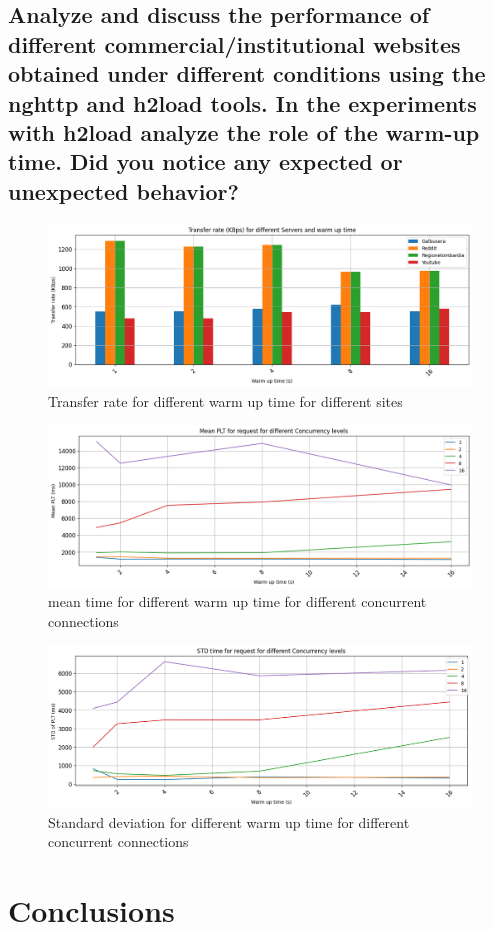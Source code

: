 \documentclass[eng]{class}
\begin{document}
\subsection*{Analyze and discuss the performance of different commercial/institutional websites obtained
  under different conditions using the nghttp and h2load tools. In the experiments with
  h2load analyze the role of the warm-up time. Did you notice any expected or unexpected
  behavior?}

\begin{figure}[H]
  \centering
  \includegraphics[width=.9\columnwidth]{images/transf_rate_diff_warm_up.png}
  \caption{Transfer rate for different warm up time for different sites}
  \label{fig-6}
\end{figure}

\begin{figure}[H]
  \centering
  \includegraphics[width=.9\columnwidth]{images/mean_time_warm_up.png}
  \caption{mean time for different warm up time for different concurrent connections}
  \label{fig-7}
\end{figure}

\begin{figure}[H]
  \centering
  \includegraphics[width=.9\columnwidth]{images/var_warm_up.png}
  \caption{Standard deviation for different warm up time for different concurrent connections}
  \label{fig-8}
\end{figure}

\section{Conclusions}
\end{document}

